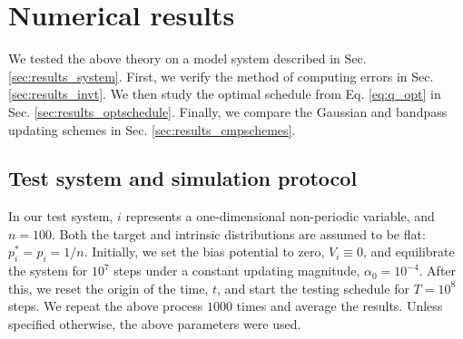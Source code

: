 \documentclass[reprint, floatfix]{revtex4-1}
\begin{document}
%
%




\section{\label{sec:results}
Numerical results}



We tested the above theory on a model system
described in Sec. \ref{sec:results_system}.
%
First, we verify the method of computing errors
in Sec. \ref{sec:results_invt}.
%
We then study the optimal schedule from
Eq. \eqref{eq:q_opt}
in Sec. \ref{sec:results_optschedule}.
%
Finally, we compare the Gaussian and
bandpass updating schemes %
in Sec. \ref{sec:results_cmpschemes}.



\subsection{\label{sec:results_system}
Test system and simulation protocol}



In our test system,
$i$ represents a one-dimensional
non-periodic variable,
and $n = 100$.
%
Both the target and intrinsic distributions
are assumed to be flat:
$p^*_i = p_i = 1/n$.
%
%
Initially,
we set the bias potential to zero,
$V_i \equiv 0$,
and equilibrate the system for $10^7$ steps
under a constant updating magnitude,
$\alpha_0 = 10^{-4}$.
%
After this,
we reset the origin of the time, $t$,
and start the testing schedule
for $T = 10^8$ steps.
%
We repeat the above process $1000$ times
and average the results.
Unless specified otherwise,
the above parameters were used.
\end{document}
